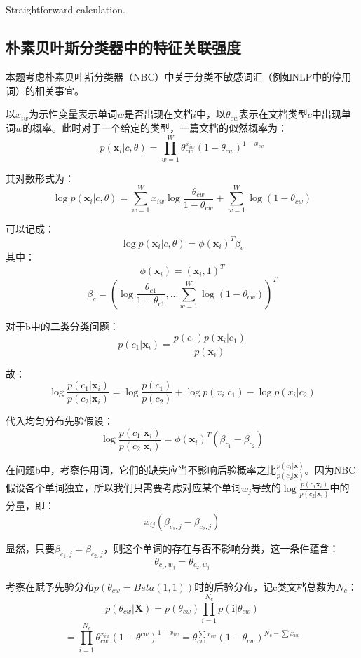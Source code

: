 \documentclass[UTF8]{ctexart}
\begin{document}
\subsection{}
Straightforward calculation.

\subsection{朴素贝叶斯分类器中的特征关联强度}
本题考虑朴素贝叶斯分类器（NBC）中关于分类不敏感词汇（例如NLP中的停用词）的相关事宜。

以$x_{iw}$为示性变量表示单词$w$是否出现在文档$i$中，以$\theta_{cw}$表示在文档类型$c$中出现单词$w$的概率。此时对于一个给定的类型，一篇文档的似然概率为：
$$p(\textbf{x}_{i}|c,\theta)=\prod_{w=1}^{W}\theta_{cw}^{x_{iw}}(1-\theta_{cw})^{1-x_{iw}}$$

其对数形式为：
$$\log p(\textbf{x}_{i}|c,\theta)=\sum_{w=1}^{W}x_{iw} \log \frac{\theta_{cw}}{1-\theta_{cw}}+\sum_{w=1}^{W}\log (1-\theta_{cw})$$

可以记成：
$$\log p(\textbf{x}_{i}|c,\theta)=\phi(\textbf{x}_{i})^{T} \beta_{c}$$
其中：
$$\phi(\textbf{x}_{i})=(\textbf{x}_{i},1)^{T}$$
$$\beta_{c}=(\log \frac{\theta_{c1}}{1-\theta_{c1}},...\sum_{w=1}^{W}\log(1-\theta_{cw}))^{T}$$

对于b中的二类分类问题：
$$p(c_{1}|\textbf{x}_{i}) = \frac{p(c_{1})p(\textbf{x}_{i}|c_{1})}{p(\textbf{x}_{i})}$$

故：
$$\log \frac{p(c_{1}|\textbf{x}_{i})}{p(c_{2}|\textbf{x}_{i})} = \log \frac{p(c_{1})}{p(c_{2})} + \log p(x_{i}|c_{1}) - \log p(x_{i}|c_{2})$$

代入均匀分布先验假设：
$$\log \frac{p(c_{1}|\textbf{x}_{i})}{p(c_{2}|\textbf{x}_{i})} = \phi(\textbf{x}_{i})^{T}(\beta_{c_{1}}-\beta_{c_{2}})$$

在问题b中，考察停用词，它们的缺失应当不影响后验概率之比$\frac{p(c_{1}|\textbf{x})}{p(c_{2}|\textbf{x})}$。因为NBC假设各个单词独立，所以我们只需要考虑对应某个单词$w_{j}$导致的$\log \frac{p(c_{1}\textbf{x}_{i})}{p(c_{2}|\textbf{x}_{i})}$中的分量，即：
$$x_{ij}(\beta_{c_{1},j}-\beta_{c_{2},j})$$

显然，只要$\beta_{c_{1},j}=\beta_{c_{2},j}$，则这个单词的存在与否不影响分类，这一条件蕴含：
$$\theta_{c_{1},w_{j}}=\theta_{c_{2},w_{j}}$$

考察在赋予先验分布$p(\theta_{cw} = Beta(1,1))$时的后验分布，记c类文档总数为$N_{c}$：
$$p(\theta_{cw}|\textbf{X})=p(\theta_{cw})\prod_{i=1}^{N_{c}}p(\textbf{i}|\theta_{cw})$$
$$=\prod_{i=1}^{N_{c}}\theta_{cw}^{x_{iw}}(1-\theta^{cw})^{1-x_{iw}}=\theta_{cw}^{\sum x_{iw}}(1-\theta_{cw})^{N_{c}-\sum x_{iw}}$$
\end{document}
